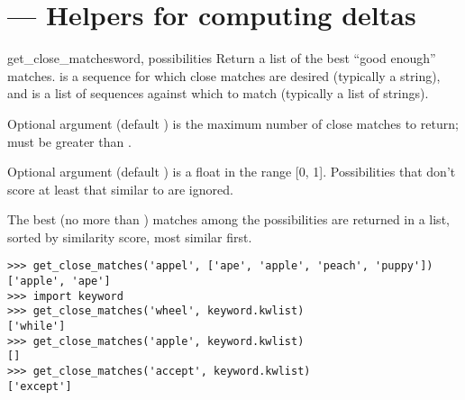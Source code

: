 \section{ ---
         Helpers for computing deltas}




\begin{funcdesc}{get_close_matches}{word, possibilities}
  Return a list of the best ``good enough'' matches.   is a
  sequence for which close matches are desired (typically a string),
  and  is a list of sequences against which to
  match  (typically a list of strings).

  Optional argument  (default ) is the maximum number
  of close matches to return;  must be greater than .

  Optional argument  (default ) is a float in
  the range [0, 1].  Possibilities that don't score at least that
  similar to  are ignored.

  The best (no more than ) matches among the possibilities are
  returned in a list, sorted by similarity score, most similar first.

\begin{verbatim}
>>> get_close_matches('appel', ['ape', 'apple', 'peach', 'puppy'])
['apple', 'ape']
>>> import keyword
>>> get_close_matches('wheel', keyword.kwlist)
['while']
>>> get_close_matches('apple', keyword.kwlist)
[]
>>> get_close_matches('accept', keyword.kwlist)
['except']
\end{verbatim}
\end{funcdesc}


